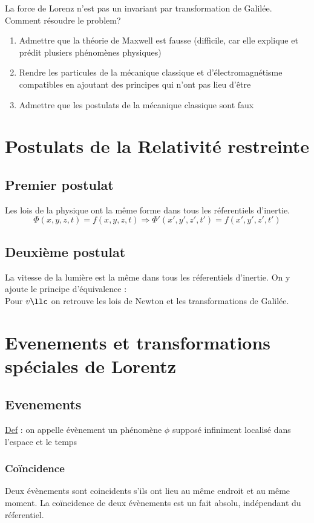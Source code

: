 \documentclass{article}
\begin{document}
La force de Lorenz n'est pas un invariant par transformation de Galilée.\\
Comment résoudre le problem?
\begin{enumerate}
    \item Admettre que la théorie de Maxwell est fausse (difficile, car elle explique et prédit plusiers phénomènes physiques)
    \item Rendre les particules de la mécanique classique et d'électromagnétisme compatibles en ajoutant des principes qui n'ont pas lieu d'être
    \item Admettre que les postulats de la mécanique classique sont faux
\end{enumerate}
\section{Postulats de la Relativité restreinte}
\subsection{Premier postulat}
Les lois de la physique ont la même forme dans tous les réferentiels d'inertie.
\begin{equation*}
    \Phi(x,y,z,t) = f(x,y,z,t) \Rightarrow \Phi'(x',y',z',t') = f(x',y',z',t')
\end{equation*}
\subsection{Deuxième postulat}
La vitesse de la lumière est la même dans tous les réferentiels d'inertie. On y ajoute le principe d'équivalence :\\
Pour $v\llc$ on retrouve les lois de Newton et les transformations de Galilée.\\
\section{Evenements et transformations spéciales de Lorentz} 
\subsection{Evenements}
\underline{Def} : on appelle évènement un phénomène $\phi$ supposé infiniment localisé dans l'espace et le temps
\subsubsection{Coïncidence}
Deux évènements sont coincidents s'ils ont lieu au même endroit et au même moment. La coïncidence de deux évènements est un fait absolu, indépendant du réferentiel.
\end{document}
